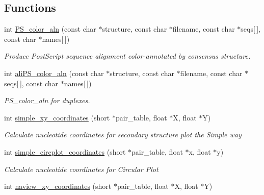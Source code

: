 \subsection*{Functions}
\begin{DoxyCompactItemize}
\item 
int \mbox{\hyperlink{group__plotting__utils__deprecated_ga821802c3685e37e15182341f6217470d}{P\+S\+\_\+color\+\_\+aln}} (const char $\ast$structure, const char $\ast$filename, const char $\ast$seqs\mbox{[}$\,$\mbox{]}, const char $\ast$names\mbox{[}$\,$\mbox{]})
\begin{DoxyCompactList}\small\item\em Produce Post\+Script sequence alignment color-\/annotated by consensus structure. \end{DoxyCompactList}\item 
int \mbox{\hyperlink{group__plotting__utils__deprecated_gaab48d4dac655d688abe921389ac2847c}{ali\+P\+S\+\_\+color\+\_\+aln}} (const char $\ast$structure, const char $\ast$filename, const char $\ast$seqs\mbox{[}$\,$\mbox{]}, const char $\ast$names\mbox{[}$\,$\mbox{]})
\begin{DoxyCompactList}\small\item\em P\+S\+\_\+color\+\_\+aln for duplexes. \end{DoxyCompactList}\item 
int \mbox{\hyperlink{group__plotting__utils__deprecated_gaf4b9173e7d3fd361c3c85e6def194123}{simple\+\_\+xy\+\_\+coordinates}} (short $\ast$pair\+\_\+table, float $\ast$X, float $\ast$Y)
\begin{DoxyCompactList}\small\item\em Calculate nucleotide coordinates for secondary structure plot the {\itshape Simple way} \end{DoxyCompactList}\item 
int \mbox{\hyperlink{group__plotting__utils__deprecated_gac4ea13d35308f09940178d2b05a248c2}{simple\+\_\+circplot\+\_\+coordinates}} (short $\ast$pair\+\_\+table, float $\ast$x, float $\ast$y)
\begin{DoxyCompactList}\small\item\em Calculate nucleotide coordinates for {\itshape Circular Plot} \end{DoxyCompactList}\item 
int \mbox{\hyperlink{group__plotting__utils__deprecated_ga948111b910926f0405a3fa920c790816}{naview\+\_\+xy\+\_\+coordinates}} (short $\ast$pair\+\_\+table, float $\ast$X, float $\ast$Y)
\end{DoxyCompactItemize}
